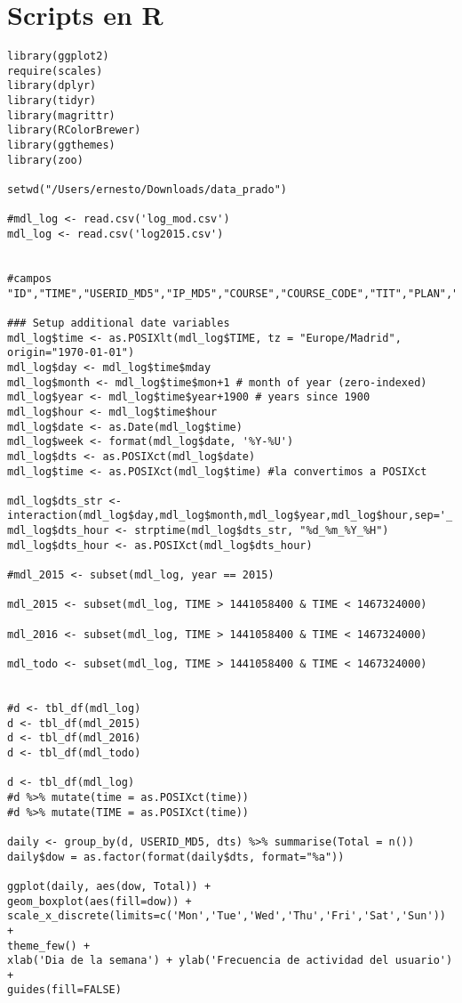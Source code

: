 \section{Scripts en R}
\begin{lstlisting}
library(ggplot2)
require(scales)
library(dplyr)
library(tidyr)
library(magrittr)
library(RColorBrewer)
library(ggthemes)
library(zoo)

setwd("/Users/ernesto/Downloads/data_prado")

#mdl_log <- read.csv('log_mod.csv')
mdl_log <- read.csv('log2015.csv')


#campos "ID","TIME","USERID_MD5","IP_MD5","COURSE","COURSE_CODE","TIT","PLAN","CEA","MODULE","CMID","ACTION","URL","INFO"

### Setup additional date variables
mdl_log$time <- as.POSIXlt(mdl_log$TIME, tz = "Europe/Madrid", origin="1970-01-01")
mdl_log$day <- mdl_log$time$mday
mdl_log$month <- mdl_log$time$mon+1 # month of year (zero-indexed)
mdl_log$year <- mdl_log$time$year+1900 # years since 1900
mdl_log$hour <- mdl_log$time$hour
mdl_log$date <- as.Date(mdl_log$time)
mdl_log$week <- format(mdl_log$date, '%Y-%U')
mdl_log$dts <- as.POSIXct(mdl_log$date)
mdl_log$time <- as.POSIXct(mdl_log$time) #la convertimos a POSIXct

mdl_log$dts_str <- interaction(mdl_log$day,mdl_log$month,mdl_log$year,mdl_log$hour,sep='_')
mdl_log$dts_hour <- strptime(mdl_log$dts_str, "%d_%m_%Y_%H")
mdl_log$dts_hour <- as.POSIXct(mdl_log$dts_hour)

#mdl_2015 <- subset(mdl_log, year == 2015)

mdl_2015 <- subset(mdl_log, TIME > 1441058400 & TIME < 1467324000)

mdl_2016 <- subset(mdl_log, TIME > 1441058400 & TIME < 1467324000)

mdl_todo <- subset(mdl_log, TIME > 1441058400 & TIME < 1467324000)


#d <- tbl_df(mdl_log)
d <- tbl_df(mdl_2015)
d <- tbl_df(mdl_2016)
d <- tbl_df(mdl_todo)

d <- tbl_df(mdl_log)
#d %>% mutate(time = as.POSIXct(time))
#d %>% mutate(TIME = as.POSIXct(time))

daily <- group_by(d, USERID_MD5, dts) %>% summarise(Total = n())
daily$dow = as.factor(format(daily$dts, format="%a"))

ggplot(daily, aes(dow, Total)) +
geom_boxplot(aes(fill=dow)) +
scale_x_discrete(limits=c('Mon','Tue','Wed','Thu','Fri','Sat','Sun')) +
theme_few() +
xlab('Dia de la semana') + ylab('Frecuencia de actividad del usuario') +
guides(fill=FALSE)


\end{lstlisting}
